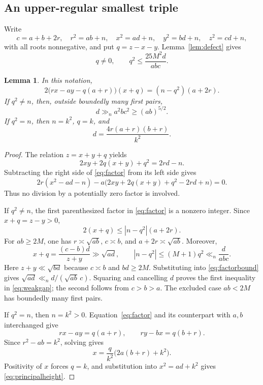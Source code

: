 \documentclass[11pt,a4paper]{article}
\numberwithin{equation}{section}
\newtheorem{lemma}[theorem]{Lemma}
\theoremstyle{remark}
\begin{document}
\subsection{An upper-regular smallest triple}
Write
\[
c=a+b+2r,\quad r^2=ab+n,\quad
x^2=ad+n,\quad y^2=bd+n,\quad z^2=cd+n,
\]
with all roots nonnegative, and put $q=z-x-y$. Lemma~\ref{lem:defect} gives
\begin{equation}\label{eq:qbound}
q\ne0,\qquad q^2\le\frac{25M^2d}{abc}.
\end{equation}
\begin{lemma}\label{lem:factor}
In this notation,
\begin{equation}\label{eq:factor}
2\bigl(rx-ay-q(a+r)\bigr)(x+q)=(n-q^2)(a+2r).
\end{equation}
If $q^2\ne n$, then, outside boundedly many first pairs,
\begin{equation}\label{eq:weakgap}
d\gg_n a^2bc^2\ge(ab)^{5/2}.
\end{equation}
If $q^2=n$, then $n=k^2$, $q=k$, and
\begin{equation}\label{eq:principalheight}
d=\frac{4r(a+r)(b+r)}{k^2}.
\end{equation}
\end{lemma}
\begin{proof}
The relation $z=x+y+q$ yields
\[
2xy+2q(x+y)+q^2=2rd-n.
\]
Subtracting the right side of \eqref{eq:factor} from its left side gives
\[
2r(x^2-ad-n)-a\bigl(2xy+2q(x+y)+q^2-2rd+n\bigr)=0.
\]
Thus no division by a potentially zero factor is involved.

If $q^2\ne n$, the first parenthesized factor in \eqref{eq:factor} is a nonzero integer. Since $x+q=z-y>0$,
\begin{equation}\label{eq:factorbound}
2(x+q)\le|n-q^2|(a+2r).
\end{equation}
For $ab\ge2M$, one has $r\asymp\sqrt{ab}$, $c\asymp b$, and $a+2r\asymp\sqrt{ab}$. Moreover,
\[
x+q=\frac{(c-b)d}{z+y}\gg\sqrt{ad},\qquad
|n-q^2|\le(M+1)q^2\ll_n\frac{d}{abc}.
\]
Here $z+y\ll\sqrt{bd}$ because $c\asymp b$ and $bd\ge2M$. Substituting into \eqref{eq:factorbound} gives $\sqrt{ad}\ll_n d/(\sqrt{ab}\,c)$. Squaring and cancelling $d$ proves the first inequality in \eqref{eq:weakgap}; the second follows from $c>b>a$. The excluded case $ab<2M$ has boundedly many first pairs.

If $q^2=n$, then $n=k^2>0$. Equation~\eqref{eq:factor} and its counterpart with $a,b$ interchanged give
\[
rx-ay=q(a+r),\qquad ry-bx=q(b+r).
\]
Since $r^2-ab=k^2$, solving gives
\[
x=\frac{q}{k^2}\bigl(2a(b+r)+k^2\bigr).
\]
Positivity of $x$ forces $q=k$, and substitution into $x^2=ad+k^2$ gives \eqref{eq:principalheight}.
\end{proof}
\end{document}
